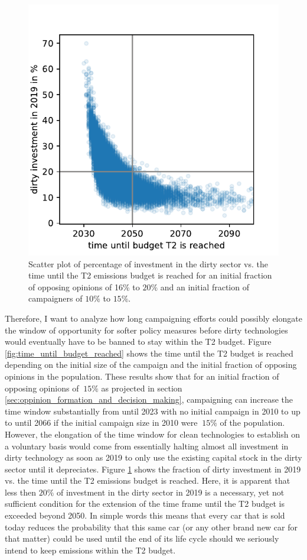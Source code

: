 \begin{figure}
	\vspace{-.4 cm}
        \hspace{-1.4 cm}
        \includegraphics[width = .57 \textwidth]{./figures/dirty_investment_consequences.pdf}
        \caption{Scatter plot of percentage of investment in the dirty sector vs. the time until the T2 emissions budget is reached for an initial fraction of opposing opinions of 16\% to $20\%$ and an initial fraction of campaigners of $10\%$ to $15\%$. \label{fig:dirty_investment_consequences}}
\end{figure}
Therefore, I want to analyze how long campaigning efforts could possibly elongate the window of opportunity for softer policy measures before dirty technologies would eventually have to be banned to stay within the T2 budget. Figure \ref{fig:time_until_budget_reached} shows the time until the T2 budget is reached depending on the initial size of the campaign and the initial fraction of opposing opinions in the population. These results show that for an initial fraction of opposing opinions of $~15\%$ as projected in section \ref{sec:oppinion_formation_and_decision_making}, campaigning can increase the time window substantially from until 2023 with no initial campaign in 2010 to up to until 2066 if the initial campaign size in 2010 were $~15\%$ of the population. However, the elongation of the time window for clean technologies to establish on a voluntary basis would come from essentially halting almost all investment in dirty technology as soon as 2019 to only use the existing capital stock in the dirty sector until it depreciates. Figure \ref{fig:dirty_investment_consequences} shows the fraction of dirty investment in 2019 vs. the time until the T2 emissions budget is reached. Here, it is apparent that less then $20\%$ of investment in the dirty sector in 2019 is a necessary, yet not sufficient condition for the extension of the time frame until the T2 budget is exceeded beyond 2050. In simple words this means that every car that is sold today reduces the probability that this same car (or any other brand new car for that matter) could be used until the end of its life cycle should we seriously intend to keep emissions within the T2 budget.

